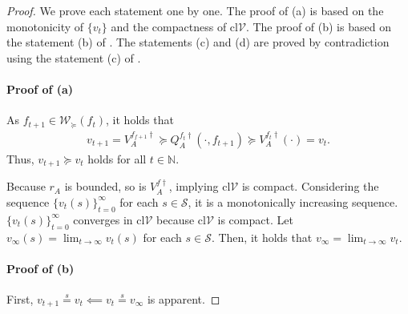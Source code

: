 \documentclass{acml}
\providecommand{\N}{\mathbb{N}} %
\providecommand{\eqs}{\stackrel{s}{=}}
\begin{document}
\begin{proof}
	We prove each statement one by one. 
    The proof of (a) is based on the monotonicity of $\{v_t\}$ and the compactness of $\mathrm{cl}\mathcal{V}$.
    The proof of (b) is based on the statement (b) of .
    The statements (c) and (d) are proved by contradiction using the statement (c) of .
    
	\paragraph{Proof of (a)}
	As $f_{t+1}\in\mathcal{W}_\succcurlyeq(f_t)$, it holds that
	\begin{align}
		v_{t+1} = V_A^{f_{f+1}\dag} \succcurlyeq
		Q_A^{f_t\dag}(\cdot,f_{t+1}) \succcurlyeq
		V_A^{f_t\dag}(\cdot) = v_t. \label{eq:monotone_improve_2}
	\end{align}
	Thus, $v_{t+1} \succcurlyeq v_{t}$ holds for all $t\in\N$.
	
	Because $r_A$ is bounded, so is $V_A^{f\dag}$, implying $\mathrm{cl}\mathcal{V}$ is compact. 
	Considering the sequence $\{v_t(s)\}_{t=0}^{\infty}$ for each $s \in \mathcal{S}$, it is a monotonically increasing sequence. $\{v_t(s)\}_{t=0}^{\infty}$ converges in $\mathrm{cl}\mathcal{V}$ because $\mathrm{cl}\mathcal{V}$ is compact. 
	Let $v_{\infty}(s) = \lim_{t\to\infty} v_t(s)$ for each $s \in \mathcal{S}$. 
	Then, it holds that $v_\infty = \lim_{t\to\infty} v_t$. 
	
	\paragraph{Proof of (b)}
	First, $v_{t+1} \eqs v_t \impliedby v_t \eqs v_\infty$ is apparent.
	

\end{proof}
\end{document}
